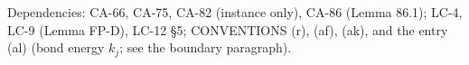 Dependencies: CA-66, CA-75, CA-82 (instance only), CA-86 (Lemma 86.1); LC-4, LC-9 (Lemma FP-D), LC-12 \S5;
CONVENTIONS (r), (af), (ak), and the entry (al) (bond energy \(k_j\); see the boundary paragraph).


